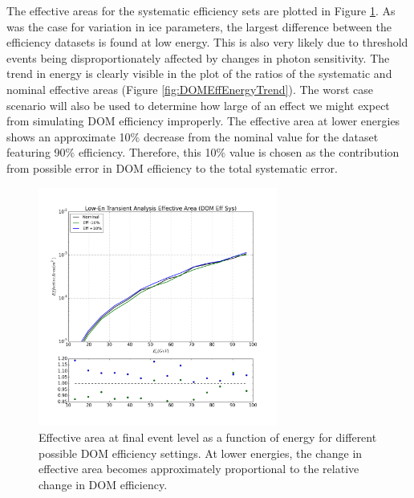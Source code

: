 \documentclass{gatech-thesis}
\begin{document}
The effective areas for the systematic efficiency sets are plotted in Figure \ref{fig:DOMSysEffArea}. As was the case for variation in ice parameters, the largest difference between the efficiency datasets is found at low energy. This is also very likely due to threshold events being disproportionately affected by changes in photon sensitivity. The trend in energy is clearly visible in the plot of the ratios of the systematic and nominal effective areas (Figure \ref{fig:DOMEffEnergyTrend}). The worst case scenario will also be used to determine how large of an effect we might expect from simulating DOM efficiency improperly. The effective area at lower energies shows an approximate 10$\%$ decrease from the nominal value for the dataset featuring 90$\%$ efficiency. Therefore, this 10$\%$ value is chosen as the contribution from possible error in DOM efficiency to the total systematic error.

\begin{figure}[ht]
  \begin{center}
    \includegraphics[width=0.7\textwidth,keepaspectratio]{LowEnTransient_EffArea_SysGENIE_DomEfficiency.png}
  \end{center}
  \caption{Effective area at final event level as a function of energy for different possible DOM efficiency settings. At lower energies, the change in effective area becomes approximately proportional to the relative change in DOM efficiency.}
  \label{fig:DOMSysEffArea}
\end{figure}
\end{document}
